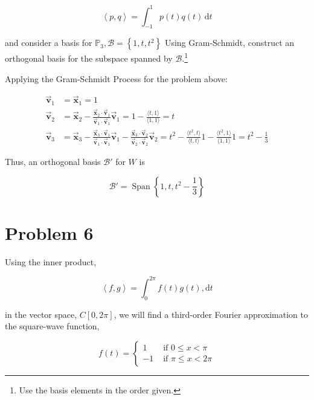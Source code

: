 \documentclass[letter,11pt]{article}
\theoremstyle{definition}
\begin{document}
$$\left\langle p, q\right\rangle=\int_{-1}^{1} p(t) q(t)\, \mathrm{d} t$$

and consider a basis for $\mathbb{P}_{3}, \mathcal{B}=\left\{1, t, t^{2}\right\}$ Using Gram-Schmidt, construct an orthogonal basis for the subspace spanned by $\mathcal{B}$.\footnote{Use the basis elements in the order given.}
\newpage
\begin{tcolorbox}[boxrule=1mm,enhanced jigsaw, breakable,before=\hfill,after=\hfill,adjusted title={Problem 5 solutions}]
    Applying the Gram-Schmidt Process for the problem above:

    \begin{align*}
        \vec{\boldsymbol{v}}_1 & = \vec{\boldsymbol{x}}_1 = 1 \\
         \vec{\boldsymbol{v}}_2 & =\vec{\boldsymbol{x}}_2-\frac{\vec{\boldsymbol{x}}_2 \cdot \vec{\boldsymbol{v}}_1}{\vec{\boldsymbol{v}}_1 \cdot \vec{\boldsymbol{v}}_1} \vec{\boldsymbol{v}}_1  = 1 - \frac{\langle t,1 \rangle}{\langle 1,1 \rangle} = t\\
         \vec{\boldsymbol{v}}_3 & =\vec{\boldsymbol{x}}_3-\frac{\vec{\boldsymbol{x}}_3 \cdot \vec{\boldsymbol{v}}_1}{\vec{\boldsymbol{v}}_1 \cdot \vec{\boldsymbol{v}}_1} \vec{\boldsymbol{v}}_1-\frac{\vec{\boldsymbol{x}}_3 \cdot \vec{\boldsymbol{v}}_2}{\vec{\boldsymbol{v}}_2 \cdot \vec{\boldsymbol{v}}_2} \vec{\boldsymbol{v}}_2 = t^2 - \frac{\langle t^2,t \rangle}{\langle t,t \rangle} 1 - \frac{\langle t^2,1 \rangle}{\langle 1,1 \rangle} 1= t^2 - \frac{1}{3}
        \end{align*}
        
        Thus, an orthogonal basis $\mathcal{B}'$ for $W$ is

        $$\boxed{\mathcal{B}' = \operatorname{Span} \left\{ 1,t,t^2 - \frac{1}{3} \right\}}$$
\end{tcolorbox}

\section{Problem 6}
Using the inner product,

$$\left\langle f, g\right\rangle=\int_{0}^{2 \pi} f(t) g(t), \mathrm{d} t$$

in the vector space, $C[0,2 \pi]$, we will find a third-order Fourier approximation to the square-wave function,

$$
f(t)= \begin{cases}1 & \text { if } 0 \leq x<\pi\\ -1 & \text { if } \pi \leq x<2 \pi\end{cases}
$$
\end{document}
